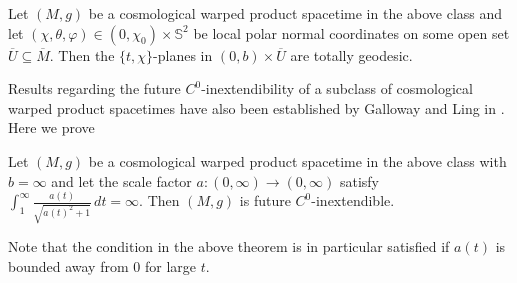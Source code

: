 \documentclass[reqno]{article}
\begin{document}
\begin{proposition}\label{PropTotGeod}
Let $(M,g)$ be a cosmological warped product spacetime in the above class and let $(\chi, \theta, \varphi) \in (0,\chi_0) \times \mathbb{S}^2$ be local polar normal coordinates on some open set $\overline{U} \subseteq \overline{M}$. Then the $\{t, \chi\}$-planes in $(0,b) \times \overline{U}$ are totally geodesic.
\end{proposition}

Results regarding the future $C^0$-inextendibility of a subclass of cosmological warped product spacetimes have also been established by Galloway and Ling in \cite{GalLin16}. Here we prove

\begin{theorem}\label{ThmFLRWFuture}
Let $(M,g)$ be a cosmological warped product spacetime in the above class with  $b = \infty$ and let the scale factor $ a : (0,\infty) \to (0,\infty)$ satisfy $\int_1^\infty \frac{a(t)}{ \sqrt{a(t)^2 + 1}}\, dt = \infty$.
Then $(M,g)$ is future $C^0$-inextendible.
\end{theorem}

Note that the condition in the above theorem is in particular satisfied if $a(t)$ is bounded away from $0$ for large $t$.
\end{document}
